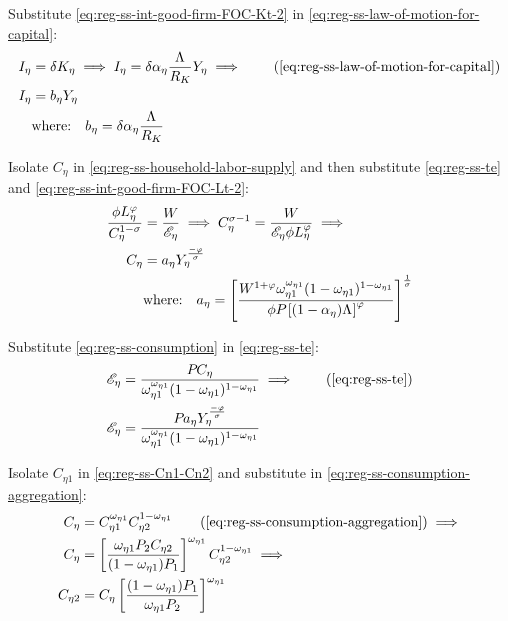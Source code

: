 \documentclass[../thesis.tex]{subfiles}
\begin{document}
	Substitute \ref{eq:reg-ss-int-good-firm-FOC-Kt-2} in \ref{eq:reg-ss-law-of-motion-for-capital}:
	\begin{align}
		I_{\eta} &= \delta K_{\eta} \implies I_{\eta} = \delta {\alpha_{\eta}} \frac{\Lambda_{}}{R_K} Y_{\eta} \implies \tag{\ref{eq:reg-ss-law-of-motion-for-capital}} \\
		I_{\eta} &= b_{\eta} Y_{\eta} \label{eq:reg-ss-investment} \\
		& \text{where:} \quad b_{\eta} = \delta {\alpha_{\eta}} \frac{\Lambda_{}}{R_K} \label{eq:reg-ss-b-eta}
	\end{align}
	
	Isolate $C_{\eta}$ in \ref{eq:reg-ss-household-labor-supply} and then substitute \ref{eq:reg-ss-te} and \ref{eq:reg-ss-int-good-firm-FOC-Lt-2}:
	\begin{align}
		\frac{\phi L_{\eta}^{\varphi}}{C_{\eta}^{1-\sigma}} &= \frac{W}{\te[]} \implies C_{\eta}^{\sigma -1} = \frac{W}{\te[] \phi L_{\eta}^{\varphi}} \implies \nonumber\\
		C_{\eta} &= a_{\eta} Y_{\eta}^{\frac{-\varphi}{\sigma}} \label{eq:reg-ss-consumption} \\
		& \text{where:} \quad a_{\eta} = \left[ \frac{W^{1 +\varphi} \omega_{\eta 1}^{\omega_{\eta 1}} (1 -\omega_{\eta 1})^{1 -\omega_{\eta 1}}}{\phi P_{} \left[ (1 -\alpha_{\eta}) \Lambda_{} \right]^{\varphi}} \right]^{\frac{1}{\sigma}} \label{eq:reg-ss-a-eta}
	\end{align}

	Substitute \ref{eq:reg-ss-consumption} in \ref{eq:reg-ss-te}:
	\begin{align}
		\te[] &= \frac{P_{} C_{\eta}}{\omega_{\eta 1}^{\omega_{\eta 1}} (1 -\omega_{\eta 1})^{1 -\omega_{\eta 1}}} \implies \tag{\ref{eq:reg-ss-te}} \\
		\te[] &= \frac{P_{} a_{\eta} Y_{\eta}^{\frac{-\varphi}{\sigma}}}{\omega_{\eta 1}^{\omega_{\eta 1}} (1 -\omega_{\eta 1})^{1 -\omega_{\eta 1}}} \label{eq:reg-ss-te-2}
	\end{align}


Isolate $C_{\eta 1}$ in \ref{eq:reg-ss-Cn1-Cn2} and substitute in \ref{eq:reg-ss-consumption-aggregation}:
\begin{align}
	C_{\eta} &= C_{\eta 1}^{\omega_{\eta 1}} C_{\eta 2}^{1-\omega_{\eta 1}} \tag{\ref{eq:reg-ss-consumption-aggregation}} \implies \\
	C_{\eta} &= \left[ \frac{\omega_{\eta 1} P_{2} C_{\eta 2}}{(1 -\omega_{\eta 1}) P_{1}} \right]^{\omega_{\eta 1}} C_{\eta 2}^{1-\omega_{\eta 1}} \implies \nonumber \\
	C_{\eta 2} &= C_{\eta} \left[ \frac{(1 - \omega_{\eta 1}) P_{1}}{\omega_{\eta 1} P_{2}} \right]^{\omega_{\eta 1}} \label{eq:reg-ss-C2-Cn-3}
\end{align}
\end{document}
